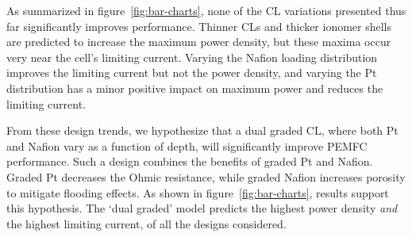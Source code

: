 \documentclass[final,3p,times,twocolumn]{elsarticle}    %
\begin{document}

As summarized in figure~\ref{fig:bar-charts}, none of the CL variations presented thus far significantly improves performance. Thinner CLs and thicker ionomer shells are predicted to increase the maximum power density, but these maxima occur very near the cell's limiting current. Varying the Nafion loading distribution improves the limiting current but not the power density, and varying the Pt distribution has a minor positive impact on maximum power and reduces the limiting current.%

From these design trends, we hypothesize that a dual graded CL, where both Pt and Nafion vary as a function of depth, will significantly improve PEMFC performance. Such a design combines the benefits of graded Pt and Nafion. Graded Pt decreases the Ohmic resistance, while graded Nafion increases porosity to mitigate flooding effects. As shown in figure~\ref{fig:bar-charts}, results support this hypothesis. The `dual graded' model predicts the highest power density \emph{and} the highest limiting current, of all the designs considered.
\end{document}
